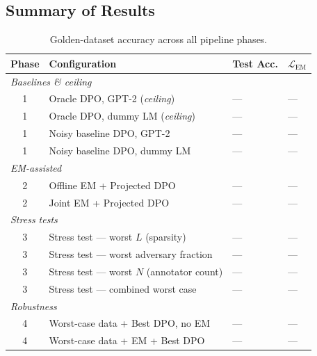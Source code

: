 \documentclass[11pt, a4paper]{article}
\begin{document}
\subsection{Summary of Results}

\begin{table}[H]
  \centering
  \caption{Golden-dataset accuracy across all pipeline phases.}
  \label{tab:summary}
  \begin{tabular}{clll}
    \toprule
    \textbf{Phase} & \textbf{Configuration} & \textbf{Test Acc.} & \textbf{$\mathcal{L}_\text{EM}$} \\
    \midrule
    \multicolumn{4}{l}{\textit{Baselines \& ceiling}} \\
    1 & Oracle DPO, GPT-2 (\textit{ceiling})                    & --- & --- \\
    1 & Oracle DPO, dummy LM (\textit{ceiling})                  & --- & --- \\
    1 & Noisy baseline DPO, GPT-2                               & --- & --- \\
    1 & Noisy baseline DPO, dummy LM                            & --- & --- \\
    \multicolumn{4}{l}{\textit{EM-assisted}} \\
    2 & Offline EM + Projected DPO                              & --- & --- \\
    2 & Joint EM + Projected DPO                                & --- & --- \\
    \multicolumn{4}{l}{\textit{Stress tests}} \\
    3 & Stress test --- worst $L$ (sparsity)                    & --- & --- \\
    3 & Stress test --- worst adversary fraction                & --- & --- \\
    3 & Stress test --- worst $N$ (annotator count)             & --- & --- \\
    3 & Stress test --- combined worst case                     & --- & --- \\
    \multicolumn{4}{l}{\textit{Robustness}} \\
    4 & Worst-case data + Best DPO, no EM                       & --- & --- \\
    4 & Worst-case data + EM + Best DPO                         & --- & --- \\
    \bottomrule
  \end{tabular}
\end{table}

\newpage
\end{document}
